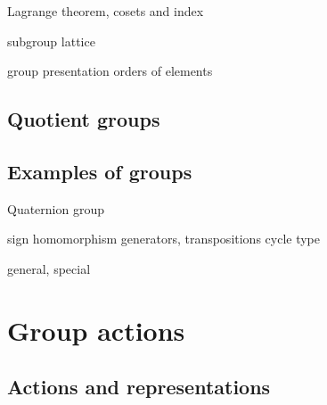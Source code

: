 \documentclass{../../large}
\begin{document}
\begin{prb}[Subgroups]
Lagrange theorem, cosets and index

subgroup lattice
\end{prb}

\begin{prb}[Generators]
group presentation
orders of elements
\end{prb}


\begin{prb}
\end{prb}


\section{Quotient groups}
\begin{prb}
\end{prb}

\begin{prb}
\end{prb}

\begin{prb}
\end{prb}




\section{Examples of groups}
\begin{prb}
\end{prb}
\begin{prb}
\end{prb}
\begin{prb}
Quaternion group
\end{prb}
\begin{prb}
sign homomorphism
generators, transpositions
cycle type
\end{prb}
\begin{prb}
general, special
\end{prb}






\chapter{Group actions}

\section{Actions and representations}
\end{document}
